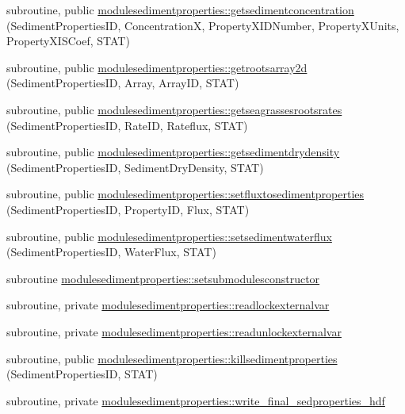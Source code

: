 \begin{DoxyCompactItemize}
\item 
subroutine, public \mbox{\hyperlink{namespacemodulesedimentproperties_adaa8d0935c5e2ecaae01dd156ea881ca}{modulesedimentproperties\+::getsedimentconcentration}} (Sediment\+Properties\+ID, ConcentrationX, Property\+X\+I\+D\+Number, Property\+X\+Units, Property\+X\+I\+S\+Coef, S\+T\+AT)
\item 
subroutine, public \mbox{\hyperlink{namespacemodulesedimentproperties_a36fdb0ce96392baedfac23a2a327bf82}{modulesedimentproperties\+::getrootsarray2d}} (Sediment\+Properties\+ID, Array, Array\+ID, S\+T\+AT)
\item 
subroutine, public \mbox{\hyperlink{namespacemodulesedimentproperties_a42d2292c7a554b05916ee8fcf65066b6}{modulesedimentproperties\+::getseagrassesrootsrates}} (Sediment\+Properties\+ID, Rate\+ID, Rateflux, S\+T\+AT)
\item 
subroutine, public \mbox{\hyperlink{namespacemodulesedimentproperties_ac8feadd6cbbbb852c325a183475aaa8c}{modulesedimentproperties\+::getsedimentdrydensity}} (Sediment\+Properties\+ID, Sediment\+Dry\+Density, S\+T\+AT)
\item 
subroutine, public \mbox{\hyperlink{namespacemodulesedimentproperties_a9049928f5adeb27938b063b548a194af}{modulesedimentproperties\+::setfluxtosedimentproperties}} (Sediment\+Properties\+ID, Property\+ID, Flux, S\+T\+AT)
\item 
subroutine, public \mbox{\hyperlink{namespacemodulesedimentproperties_adc94767ccafe5984e0d36e04b40f9c5a}{modulesedimentproperties\+::setsedimentwaterflux}} (Sediment\+Properties\+ID, Water\+Flux, S\+T\+AT)
\item 
subroutine \mbox{\hyperlink{namespacemodulesedimentproperties_acc4f3e2fa34ac7c083b5c86382b68a59}{modulesedimentproperties\+::setsubmodulesconstructor}}
\item 
subroutine, private \mbox{\hyperlink{namespacemodulesedimentproperties_a395db65fca9389b9904d43f9fc450c03}{modulesedimentproperties\+::readlockexternalvar}}
\item 
subroutine, private \mbox{\hyperlink{namespacemodulesedimentproperties_a442696b0f51e8020b42b7a5c2af05721}{modulesedimentproperties\+::readunlockexternalvar}}
\item 
subroutine, public \mbox{\hyperlink{namespacemodulesedimentproperties_a69dda6f50e9b65498825a76aa325a968}{modulesedimentproperties\+::killsedimentproperties}} (Sediment\+Properties\+ID, S\+T\+AT)
\item 
subroutine, private \mbox{\hyperlink{namespacemodulesedimentproperties_ac2dfd3d9cf57dcc8a9d3533203128931}{modulesedimentproperties\+::write\+\_\+final\+\_\+sedproperties\+\_\+hdf}}

\end{DoxyCompactItemize}
